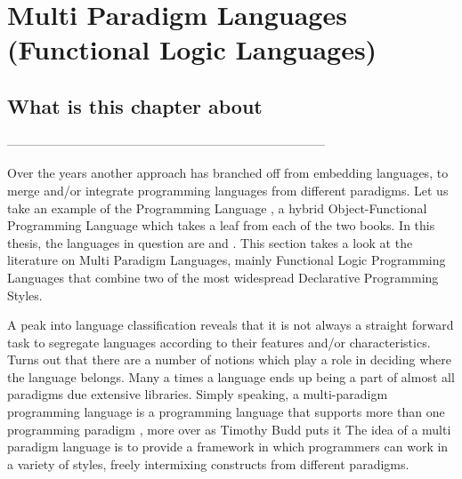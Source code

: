 \documentclass[thesis-solanki.tex]{subfiles}
\begin{document}
\chapter{Multi Paradigm Languages (Functional Logic Languages)}\label{chap:multiparadigm}


\section{What is this chapter about}

-----------------------------------------------------------------------------


Over the years another approach has branched off from embedding languages, to merge and/or integrate programming 
languages from different paradigms. Let us take an example of the  Programming Language \cite{website:scala}, a 
hybrid Object-Functional Programming Language which takes a leaf from each of the two books. In this thesis, the languages in 
question are  and . This section takes a look at the literature on Multi Paradigm Languages, mainly Functional 
Logic Programming Languages that combine two of the most widespread Declarative Programming Styles.

A peak into language classification reveals that it is not always a straight forward task to segregate languages
according to their features and/or characteristics.
Turns out that there are a number of notions which play a role in deciding where the language belongs.
Many a times a language ends up being a part of almost all paradigms due extensive libraries.
Simply speaking, a multi-paradigm programming language is a programming language that supports more than one
programming paradigm \cite{Krishnamurthi:2008:TPL:1480828.1480846}, more over as Timothy Budd puts it
\cite{website:wikimultiparadigm} The idea of a multi paradigm language is to provide a framework in which
programmers can work in a variety of styles, freely intermixing constructs from different paradigms.



\begin{comment}
\subparagraph{}
In this section we talk about marrying or integrating the paradigms, multi paradigm programming language approach.
Here we talk about combining the two most important and widely spread declarative paradigms, Functional and Logical
Programming Paradigms.
\end{comment}  
\end{document}
